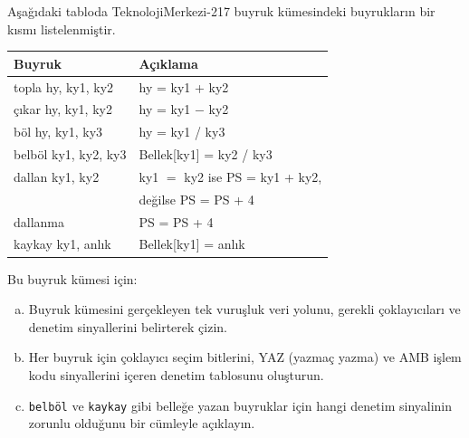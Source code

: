 \begin{alistirma}[\orta]
Aşağıdaki tabloda TeknolojiMerkezi-217 buyruk kümesindeki buyrukların bir kısmı listelenmiştir.

\begin{center}
\begin{tabular}{ll}
\toprule
\textbf{Buyruk} & \textbf{Açıklama} \\
\midrule
topla hy, ky1, ky2 & hy = ky1 + ky2 \\
çıkar hy, ky1, ky2 & hy = ky1 $-$ ky2 \\
böl hy, ky1, ky3 & hy = ky1 / ky3 \\
belböl ky1, ky2, ky3 & Bellek[ky1] = ky2 / ky3 \\
dallan ky1, ky2 & ky1 $=$ ky2 ise PS = ky1 + ky2, \\
 & değilse PS = PS + 4 \\
dallanma & PS = PS + 4 \\
kaykay ky1, anlık & Bellek[ky1] = anlık \\
\bottomrule
\end{tabular}
\end{center}

Bu buyruk kümesi için:
\begin{enumerate}[(a)]
    \item Buyruk kümesini gerçekleyen tek vuruşluk veri yolunu, gerekli çoklayıcıları ve denetim sinyallerini belirterek çizin.
    \item Her buyruk için çoklayıcı seçim bitlerini, YAZ (yazmaç yazma) ve AMB işlem kodu sinyallerini içeren denetim tablosunu oluşturun.
    \item \texttt{belböl} ve \texttt{kaykay} gibi belleğe yazan buyruklar için hangi denetim sinyalinin zorunlu olduğunu bir cümleyle açıklayın.
\end{enumerate}
\end{alistirma}

